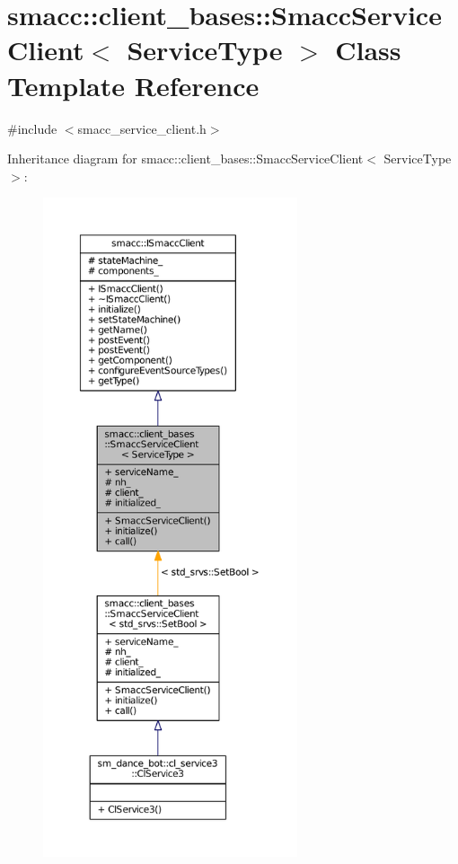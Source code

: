 \hypertarget{classsmacc_1_1client__bases_1_1SmaccServiceClient}{}\section{smacc\+:\+:client\+\_\+bases\+:\+:Smacc\+Service\+Client$<$ Service\+Type $>$ Class Template Reference}
\label{classsmacc_1_1client__bases_1_1SmaccServiceClient}


{\ttfamily \#include $<$smacc\+\_\+service\+\_\+client.\+h$>$}



Inheritance diagram for smacc\+:\+:client\+\_\+bases\+:\+:Smacc\+Service\+Client$<$ Service\+Type $>$\+:
\nopagebreak
\begin{figure}[H]
\begin{center}
\leavevmode
\includegraphics[height=550pt]{classsmacc_1_1client__bases_1_1SmaccServiceClient__inherit__graph}
\end{center}
\end{figure}


